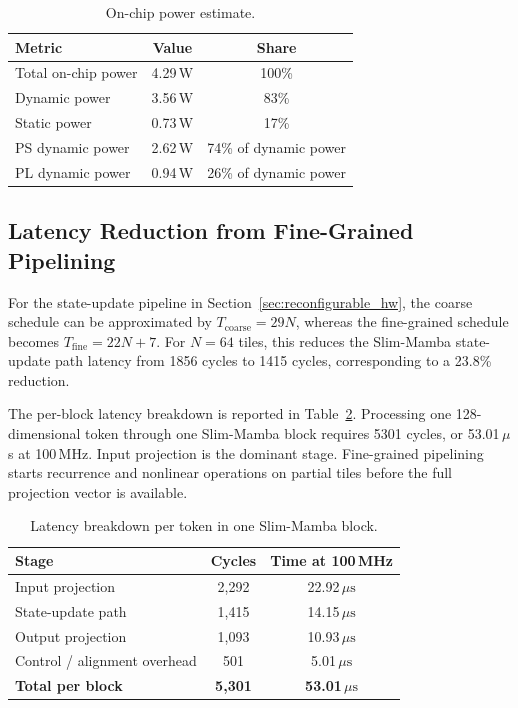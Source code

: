 \documentclass[lettersize,journal]{IEEEtran}
\begin{document}
\begin{table}[!t]
\caption{On-chip power estimate.}
\label{tab:power_summary_tcas}
\begin{center}
\footnotesize
\setlength{\tabcolsep}{6pt}
\renewcommand{\arraystretch}{1.08}
\begin{tabular}{|l|c|c|}
\hline
\textbf{Metric} & \textbf{Value} & \textbf{Share} \\
\hline
Total on-chip power & 4.29\,W & 100\% \\
\hline
Dynamic power & 3.56\,W & 83\% \\
\hline
Static power & 0.73\,W & 17\% \\
\hline
PS dynamic power & 2.62\,W & 74\% of dynamic power \\
\hline
PL dynamic power & 0.94\,W & 26\% of dynamic power \\
\hline
\end{tabular}
\end{center}
\end{table}

\subsection{Latency Reduction from Fine-Grained Pipelining}

For the state-update pipeline in Section~\ref{sec:reconfigurable_hw}, the
coarse schedule can be approximated by
\(T_{\mathrm{coarse}}=29N\), whereas the fine-grained schedule becomes
\(T_{\mathrm{fine}}=22N+7\). For \(N=64\) tiles, this reduces the Slim-Mamba state-update path
latency from 1856 cycles to 1415 cycles, corresponding to a 23.8\% reduction.

The per-block latency breakdown is reported in
Table~\ref{tab:block_latency_tcas}. Processing one 128-dimensional token
through one Slim-Mamba block requires 5301 cycles,
or 53.01\(\,\mu\)s at 100\,MHz. Input projection is the dominant stage.
Fine-grained pipelining starts recurrence and nonlinear operations on partial
tiles before the full projection vector is available.

\begin{table}[!t]
\caption{Latency breakdown per token in one Slim-Mamba block.}
\label{tab:block_latency_tcas}
\begin{center}
\footnotesize
\setlength{\tabcolsep}{6pt}
\renewcommand{\arraystretch}{1.08}
\begin{tabular}{|l|c|c|}
\hline
\textbf{Stage} & \textbf{Cycles} & \textbf{Time at 100\,MHz} \\
\hline
Input projection & 2,292 & 22.92\,\(\mu\mathrm{s}\) \\
\hline
State-update path & 1,415 & 14.15\,\(\mu\mathrm{s}\) \\
\hline
Output projection & 1,093 & 10.93\,\(\mu\mathrm{s}\) \\
\hline
Control / alignment overhead & 501 & 5.01\,\(\mu\mathrm{s}\) \\
\hline
\textbf{Total per block} & \textbf{5,301} & \textbf{53.01\,\(\mu\mathrm{s}\)} \\
\hline
\end{tabular}
\end{center}
\end{table}
\end{document}
